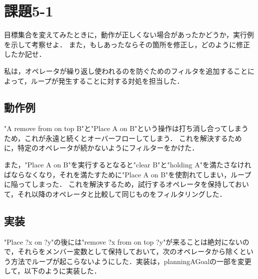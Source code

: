 \documentclass{jarticle}
\begin{document}
\section{課題5-1}
\begin{screen}
目標集合を変えてみたときに，動作が正しくない場合があったかどうか，実行例を示して考察せよ．
また，もしあったならその箇所を修正し，どのように修正したか記せ．
\end{screen}

私は，オペレータが繰り返し使われるのを防ぐためのフィルタを追加することによって，ループが発生することに対する対処を担当した．

\subsection{動作例}
"A remove from on top B"と"Place A on B"という操作は打ち消し合ってしまうため，これが永遠と続くとオーバーフローしてしまう．
これを解決するために，特定のオペレータが続かないようにフィルターをかけた．

また，"Place A on B"を実行するとなると"clear B"と"holding A"を満たさなければならなくなり，それを満たすために"Place A on B"を使割れてしまい，ループに陥ってしまった．
これを解決するため，試行するオペレータを保持しておいて，それ以降のオペレータと比較して同じものをフィルタリングした．
\subsection{実装}
"Place ?x on ?y"の後には"remove ?x from on top ?y"が来ることは絶対にないので，それらをメンバー変数として保持しておいて，次のオペレータから除くという方法でループが起こらないようにした．実装は，planningAGoalの一部を変更して，以下のように実装した．
\end{document}
